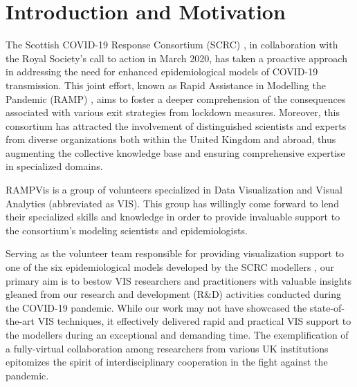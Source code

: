\section{Introduction and Motivation}
\label{sec:intro}

The Scottish COVID-19 Response Consortium (SCRC) \cite{2020University}, in collaboration with the Royal Society's call to action in March 2020, has taken a proactive approach in addressing the need for enhanced epidemiological models of COVID-19 transmission.
This joint effort, known as Rapid Assistance in Modelling the Pandemic (RAMP) \cite{2020Rapid}, aims to foster a deeper comprehension of the consequences associated with various exit strategies from lockdown measures.
Moreover, this consortium has attracted the involvement of distinguished scientists and experts from diverse organizations both within the United Kingdom and abroad, thus augmenting the collective knowledge base and ensuring comprehensive expertise in specialized domains.

RAMPVis \cite{2020Visualization} is a group of volunteers specialized in Data Visualization and Visual Analytics (abbreviated as VIS).
This group has willingly come forward to lend their specialized skills and knowledge in order to provide invaluable support to the consortium's modeling scientists and epidemiologists.

Serving as the volunteer team responsible for providing visualization support to one of the six epidemiological models developed by the SCRC modellers \cite{chen2022RAMPVIS}, our primary aim is to bestow VIS researchers and practitioners with valuable insights gleaned from our research and development (R\&D) activities conducted during the COVID-19 pandemic.
While our work may not have showcased the state-of-the-art VIS techniques, it effectively delivered rapid and practical VIS support to the modellers during an exceptional and demanding time.
The exemplification of a fully-virtual collaboration among researchers from various UK institutions epitomizes the spirit of interdisciplinary cooperation in the fight against the pandemic.


